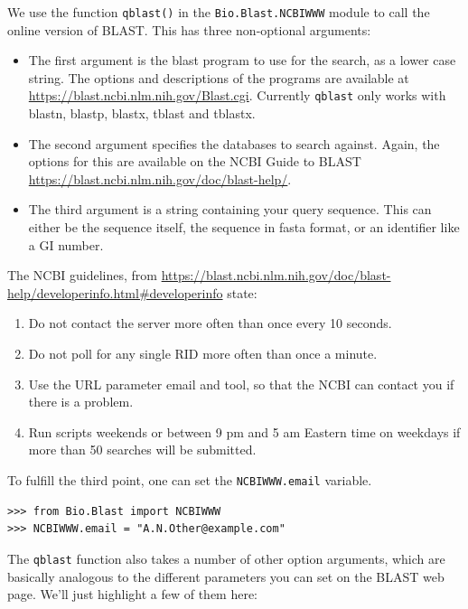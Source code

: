 We use the function \verb|qblast()| in the \verb|Bio.Blast.NCBIWWW| module
to call the online version of BLAST.  This has three non-optional arguments:
\begin{itemize}
\item The first argument is the blast program to use for the search, as a
lower case string. The options and descriptions of the programs are
available at \url{https://blast.ncbi.nlm.nih.gov/Blast.cgi}.
Currently \verb|qblast| only works with blastn, blastp, blastx, tblast
and tblastx.
\item The second argument specifies the databases to search against. Again,
the options for this are available on the NCBI Guide to BLAST
\url{https://blast.ncbi.nlm.nih.gov/doc/blast-help/}.
\item The third argument is a string containing your query sequence.  This
can either be the sequence itself, the sequence in fasta format,
or an identifier like a GI number.
\end{itemize}

The NCBI guidelines, from \url{https://blast.ncbi.nlm.nih.gov/doc/blast-help/developerinfo.html#developerinfo} state:
\begin{enumerate}
\item Do not contact the server more often than once every 10 seconds.
\item Do not poll for any single RID more often than once a minute.
\item Use the URL parameter email and tool, so that the NCBI can contact you if there is a problem.
\item Run scripts weekends or between 9 pm and 5 am Eastern time on weekdays if more than 50 searches will be submitted.
\end{enumerate}

To fulfill the third point, one can set the \verb|NCBIWWW.email| variable.
\begin{verbatim}
>>> from Bio.Blast import NCBIWWW
>>> NCBIWWW.email = "A.N.Other@example.com"
\end{verbatim}

The \verb|qblast| function also takes a number of other option arguments,
which are basically analogous to the different parameters you can set
on the BLAST web page.  We'll just highlight a few of them here:

